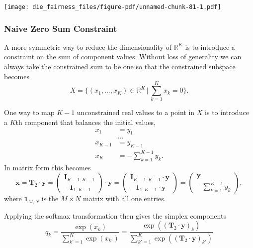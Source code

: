 \documentclass[
  letterpaper,
  DIV=11,
  numbers=noendperiod]{scrartcl}
\begin{document}
\texttt{[image: die\_fairness\_files/figure-pdf/unnamed-chunk-81-1.pdf]}

\subsubsection{Naive Zero Sum
Constraint}\label{naive-zero-sum-constraint}

A more symmetric way to reduce the dimensionality of \(\mathbb{R}^{K}\)
is to introduce a constraint on the sum of component values. Without
loss of generality we can always take the constrained sum to be one so
that the constrained subspace becomes \[
X = \bigg\{ (x_{1}, \ldots, x_{K}) \in \mathbb{R}^{K} \, \bigg\vert \,
            \sum_{k = 1}^{K} x_{k} = 0 \bigg\}.
\]

One way to map \(K - 1\) unconstrained real values to a point in \(X\)
is to introduce a \(K\)th component that balances the initial values,
\begin{align*}
x_{1} &= y_{1}
\\
& \ldots
\\
x_{K - 1} &= y_{K - 1}
\\
x_{K} &= - \sum_{k = 1}^{K - 1} y_{k}.
\end{align*} In matrix form this becomes \[
\mathbf{x}
=
\mathbf{T}_{2} \cdot \mathbf{y}
=
\begin{pmatrix}
\mathbf{I}_{K - 1, K - 1} \\
-\mathbf{1}_{1, K - 1}
\end{pmatrix}
\cdot
\mathbf{y}
=
\begin{pmatrix}
\mathbf{I}_{K - 1, K - 1} \cdot \mathbf{y} \\
-\mathbf{1}_{1, K - 1} \cdot \mathbf{y}
\end{pmatrix}
=
\begin{pmatrix}
\mathbf{y} \\
- \sum_{k = 1}^{K - 1} y_{k}
\end{pmatrix},
\] where \(\mathbf{1}_{M, N}\) is the \(M \times N\) matrix with all one
entries.

Applying the softmax transformation then gives the simplex components \[
q_{k}
=
\frac{ \exp( x_{k} ) }
{ \sum_{k' = 1}^{K} \exp( x_{k'} ) }
=
\frac{ \exp( ( \mathbf{T}_{2} \cdot \mathbf{y} )_{k} ) }
{ \sum_{k' = 1}^{K} \exp( ( \mathbf{T}_{2} \cdot \mathbf{y} )_{k'} ) }
\]
\end{document}
